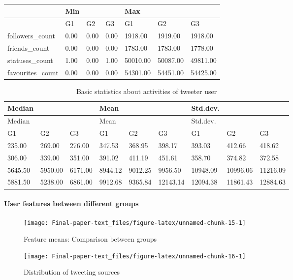 \documentclass[]{article}
\let\oldparagraph\paragraph
\renewcommand{\paragraph}[1]{\oldparagraph{#1}\mbox{}}
\begin{document}
\begin{longtable}[]{@{}lllllll@{}}
\toprule
& Min & & & Max & &\tabularnewline
\midrule
\endhead
& G1 & G2 & G3 & G1 & G2 & G3\tabularnewline
followers\_count & 0.00 & 0.00 & 0.00 & 1918.00 & 1919.00 &
1918.00\tabularnewline
friends\_count & 0.00 & 0.00 & 0.00 & 1783.00 & 1783.00 &
1778.00\tabularnewline
statuses\_count & 1.00 & 0.00 & 1.00 & 50010.00 & 50087.00 &
49811.00\tabularnewline
favourites\_count & 0.00 & 0.00 & 0.00 & 54301.00 & 54451.00 &
54425.00\tabularnewline
\bottomrule
\end{longtable}

\begin{longtable}[]{@{}lllllllll@{}}
\caption{Basic statistics about activities of tweeter
user}\tabularnewline
\toprule
Median & & & Mean & & & Std.dev. & &\tabularnewline
\midrule
\endfirsthead
\toprule
Median & & & Mean & & & Std.dev. & &\tabularnewline
\midrule
\endhead
G1 & G2 & G3 & G1 & G2 & G3 & G1 & G2 & G3\tabularnewline
235.00 & 269.00 & 276.00 & 347.53 & 368.95 & 398.17 & 393.03 & 412.66 &
418.62\tabularnewline
306.00 & 339.00 & 351.00 & 391.02 & 411.19 & 451.61 & 358.70 & 374.82 &
372.58\tabularnewline
5645.50 & 5950.00 & 6171.00 & 8944.12 & 9012.25 & 9956.50 & 10948.09 &
10996.06 & 11216.09\tabularnewline
5881.50 & 5238.00 & 6861.00 & 9912.68 & 9365.84 & 12143.14 & 12094.38 &
11861.43 & 12884.63\tabularnewline
\bottomrule
\end{longtable}

\hypertarget{user-features-between-different-groups}{%
\paragraph{User features between different
groups}\label{user-features-between-different-groups}}

\begin{figure}

{\centering \texttt{[image: Final-paper-text\_files/figure-latex/unnamed-chunk-15-1]} 

}

\caption{Feature means: Comparison between groups}\label{fig:unnamed-chunk-15}
\end{figure}

\begin{figure}

{\centering \texttt{[image: Final-paper-text\_files/figure-latex/unnamed-chunk-16-1]} 

}

\caption{Distribution of tweeting sources}\label{fig:unnamed-chunk-16}
\end{figure}
\end{document}
